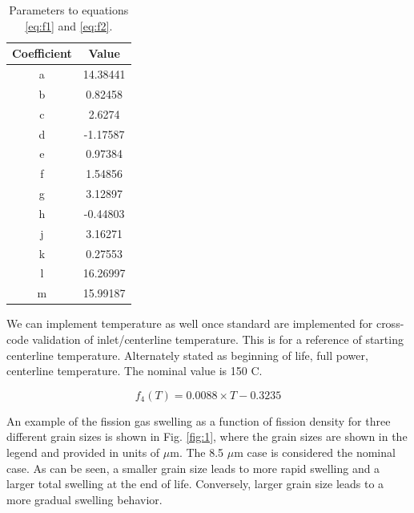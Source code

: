 \documentclass[11pt, oneside]{article}   	%
\begin{document}
\begin{table}[htp]
\caption{Parameters to equations \ref{eq:f1} and \ref{eq:f2}.}
\begin{center}
\begin{tabular}{|c|c|}
\hline
Coefficient & Value \\
\hline
a	&	14.38441	\\
b	&	0.82458	\\
c	&	2.6274	\\
d	&	-1.17587	\\
e	&	0.97384	\\
f	&	1.54856	\\
g	&	3.12897	\\
h	&	-0.44803	\\
j	&	3.16271	\\
k	&	0.27553	\\
l	&	16.26997	\\
m	&	15.99187	\\
\hline
\end{tabular}
\end{center}
\label{default}
\end{table}%


We can implement temperature as well once standard are implemented for cross-code validation of inlet/centerline temperature. This is for a reference of starting centerline temperature. Alternately stated as beginning of life, full power, centerline temperature. The nominal value is 150 \degree C.

\begin{equation}
f_4(T) = 0.0088 \times T - 0.3235
\end{equation}

An example of the fission gas swelling as a function of fission density for three different grain sizes is shown in Fig. \ref{fig:1}, where the grain sizes are shown in the legend and provided in units of $\mu$m. The 8.5 $\mu$m case is considered the nominal case. As can be seen, a smaller grain size leads to more rapid swelling and a larger total swelling at the end of life. Conversely, larger grain size leads to a more gradual swelling behavior. 
\end{document}
